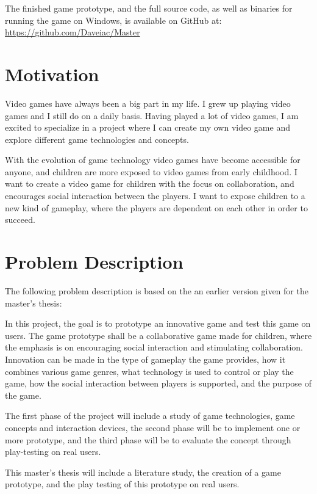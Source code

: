 The finished game prototype, and the full source code, as well as binaries for running the game on Windows, is available on GitHub at: \\
\url{https://github.com/Daveiac/Master}


\section{Motivation}
Video games have always been a big part in my life. I grew up playing video games and I still do on a daily basis. Having played a lot of video games, I am excited to specialize in a project where I can create my own video game and explore different game technologies and concepts.

With the evolution of game technology video games have become accessible for anyone, and children are more exposed to video games from early childhood. I want to create a video game for children with the focus on collaboration, and encourages social interaction between the players. I want to expose children to a new kind of gameplay, where the players are dependent on each other in order to succeed.


\section{Problem Description}
The following problem description is based on the an earlier version given for the master's thesis:

\begin{displayquote}
	In this project, the goal is to prototype an innovative game and test this game on users. The game prototype shall be a collaborative game made for children, where the emphasis is on encouraging social interaction and stimulating collaboration. Innovation can be made in the type of gameplay the game provides, how it combines various game genres, what technology is used to control or play the game, how the social interaction between players is supported, and the purpose of the game.
	
	The first phase of the project will include a study of game technologies, game concepts and interaction devices, the second phase will be to implement one or more prototype, and the third phase will be to evaluate the concept through play-testing on real users.
\end{displayquote}

This master's thesis will include a literature study, the creation of a game prototype, and the play testing of this prototype on real users.


